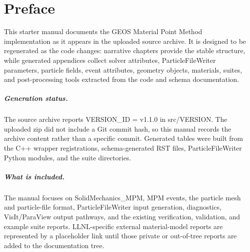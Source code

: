 \chapter*{Preface}

This starter manual documents the GEOS Material Point Method implementation as it appears in the uploaded source archive.  It is designed to be regenerated as the code changes: narrative chapters provide the stable structure, while generated appendices collect solver attributes, ParticleFileWriter parameters, particle fields, event attributes, geometry objects, materials, suites, and post-processing tools extracted from the code and schema documentation.

\paragraph{Generation status.} The source archive reports {\ttfamily VERSION\_\allowbreak{}ID = v1.\allowbreak{}1.\allowbreak{}0} in {\ttfamily\footnotesize src/\allowbreak{}VERSION}.  The uploaded zip did not include a Git commit hash, so this manual records the archive content rather than a specific commit.  Generated tables were built from the C++ wrapper registrations, schema-generated RST files, ParticleFileWriter Python modules, and the suite directories.

\paragraph{What is included.} The manual focuses on {\ttfamily Solid\allowbreak{}Mechanics\_\allowbreak{}MPM}, MPM events, the particle mesh and particle-file format, ParticleFileWriter input generation, diagnostics, VisIt/ParaView output pathways, and the existing verification, validation, and example suite reports.  LLNL-specific external material-model reports are represented by a placeholder link until those private or out-of-tree reports are added to the documentation tree.

